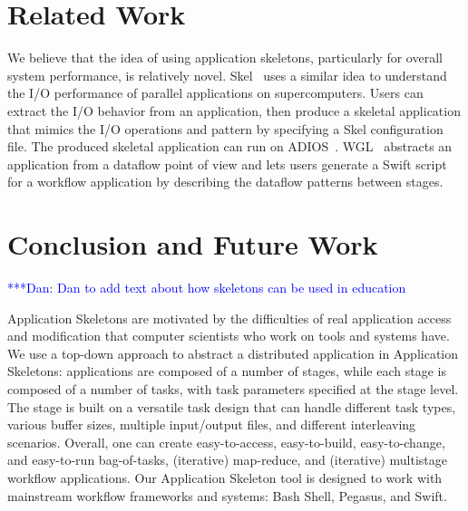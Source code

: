 \documentclass[preprint,12pt]{elsarticle}
\newcommand{\katznote}[1]{ {\textcolor{blue}    { ***Dan:   #1 }}}
\newcommand{\amnote}[1]{{\textcolor{magenta}    { ***Andre: #1 }}}
\newcommand{\katznote}[1]{}
\newcommand{\amnote}[1]{}
\begin{document}
\section{Related Work}\label{lb:RFwork}


We believe that the idea of using application skeletons, particularly for overall system performance, is relatively novel.  Skel~\cite{Skel} uses a similar idea to understand the I/O performance of parallel applications on supercomputers. Users can extract 
the I/O behavior from an application, then produce a skeletal application that mimics the I/O operations and pattern by specifying
a Skel configuration file. The produced skeletal application can run on ADIOS~\cite{ADIOS}. 
WGL~\cite{WGL} abstracts an application from a dataflow point of view and lets users generate a Swift script for a workflow application by 
describing the dataflow patterns between stages.

\section{Conclusion and Future Work}\label{lb:Con}

\katznote{Dan to add text about how skeletons can be used in education}

Application Skeletons are motivated by the difficulties of real application access and modification that computer scientists who work on tools and systems have. We use a top-down approach to abstract a distributed application in Application Skeletons: applications 
are composed of a number of stages, while each stage is composed of a number of tasks, with task parameters specified at the stage level. The stage is built on a versatile task design that can handle different task types, various buffer
sizes, multiple input/output files, and different interleaving scenarios. Overall, one can create easy-to-access, easy-to-build, easy-to-change, and easy-to-run bag-of-tasks, 
(iterative) map-reduce, and (iterative) multistage workflow applications. Our Application Skeleton  tool is designed to work with mainstream workflow
frameworks and systems: Bash Shell, Pegasus, and Swift.
\end{document}

